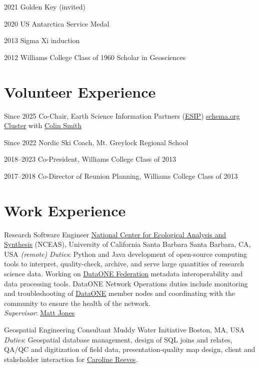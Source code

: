 \documentclass[a4paper,12pt,sans,colorlinks]{moderncv}
\newcommand{\mattjones}{\href{https://orcid.org/0000-0003-0077-4738}{Matt Jones}}
\newcommand{\esip}{\href{https://www.esipfed.org/}{ESIP}}
\newcommand{\esipsocluster}{\href{https://www.esipfed.org/collaboration-areas/schema-org/}{schema.org Cluster}}
\newcommand{\colinsmith}{\href{https://limnology.wisc.edu/staff/smith-colin/}{Colin Smith}}
\newcommand{\caroline}{\href{https://www.muddywaterinitiative.org/leadership}{Caroline Reeves}}
\newcommand{\hilary}{Hilary Greene}
\newcommand{\dataone}{\href{https://www.dataone.org/}{DataONE}}
\newcommand{\dataonefed}{\href{https://www.dataone.org/}{DataONE Federation}}
\newcommand{\nceas}{\href{https://www.nceas.ucsb.edu/}{National Center for Ecological Analysis and Synthesis}}
\begin{document}
\cvline
{2021}
{Golden Key (invited)}

\cvline
{2020}
{US Antarctica Service Medal}

\cvline
{2013}
{Sigma Xi induction}

\cvline
{2012}
{Williams College Class of 1960 Scholar in Geosciences}


\section{Volunteer Experience}

\cvline
{Since 2025}
{Co-Chair, Earth Science Information Partners (\esip{}) \esipsocluster{} with \colinsmith{}}

\cvline
{Since 2022}
{Nordic Ski Coach, Mt. Greylock Regional School}

\cvline
{2018--2023}
{Co-President, Williams College Class of 2013}

\cvline
{2017--2018}
{Co-Director of Reunion Planning, Williams College Class of 2013}

\newpage
\section{Work Experience}

{Research Software Engineer}
{\nceas{} (NCEAS), University of California Santa Barbara}
{Santa Barbara, CA, USA \emph{(remote)}}
{}
{
    \emph{Duties}: Python and Java development of open-source computing
    tools to interpret, quality-check, archive, and serve large quantities of research science data.
    Working on \dataonefed{} metadata interoperability and data processing tools.
    DataONE Network Operations duties include monitoring and troubleshooting of \dataone{} member nodes
    and coordinating with the community to ensure the health of the network.
    \\
    \emph{Supervisor}: \mattjones
}


{Geospatial Engineering Consultant}
{Muddy Water Initiative}
{Boston, MA, USA}
{}
{
    \emph{Duties}: Geospatial database management, design of SQL joins and
    relates, QA/QC and digitization of field data, presentation-quality map
    design, client and stakeholder interaction for \caroline.
}
\end{document}
